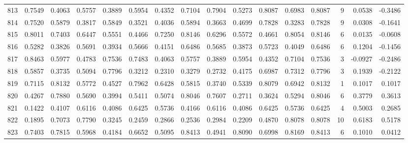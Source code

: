 \begin{tabular}{lrrrrrrrrrrrrrrr}
813 &      0.7549 &  0.4063 &  0.5757 &  0.3889 &  0.5954 &  0.4352 &  0.7104 &  0.7904 &  0.5273 &  0.8087 &   0.6983 &     0.8087 &      9 &                    0.0538 &                    -0.3486 \\
814 &      0.7520 &  0.5879 &  0.3817 &  0.5849 &  0.3521 &  0.4036 &  0.5894 &  0.3663 &  0.4699 &  0.7828 &   0.3283 &     0.7828 &      9 &                    0.0308 &                    -0.1641 \\
815 &      0.8011 &  0.7403 &  0.6447 &  0.5551 &  0.4466 &  0.7250 &  0.8146 &  0.6296 &  0.5572 &  0.4661 &   0.8054 &     0.8146 &      6 &                    0.0135 &                    -0.0608 \\
816 &      0.5282 &  0.3826 &  0.5691 &  0.3934 &  0.5666 &  0.4151 &  0.6486 &  0.5685 &  0.3873 &  0.5723 &   0.4049 &     0.6486 &      6 &                    0.1204 &                    -0.1456 \\
817 &      0.8463 &  0.5977 &  0.4783 &  0.7536 &  0.7483 &  0.4063 &  0.5757 &  0.3889 &  0.5954 &  0.4352 &   0.7104 &     0.7536 &      3 &                   -0.0927 &                    -0.2486 \\
818 &      0.5857 &  0.3735 &  0.5094 &  0.7796 &  0.3212 &  0.2310 &  0.3279 &  0.2732 &  0.4175 &  0.6987 &   0.7312 &     0.7796 &      3 &                    0.1939 &                    -0.2122 \\
819 &      0.7115 &  0.8132 &  0.5772 &  0.4527 &  0.7962 &  0.6428 &  0.5815 &  0.3740 &  0.5339 &  0.8079 &   0.6942 &     0.8132 &      1 &                    0.1017 &                     0.1017 \\
820 &      0.4267 &  0.7880 &  0.5690 &  0.3994 &  0.5411 &  0.5074 &  0.8046 &  0.7607 &  0.2711 &  0.3624 &   0.5294 &     0.8046 &      6 &                    0.3779 &                     0.3613 \\
821 &      0.1422 &  0.4107 &  0.6116 &  0.4086 &  0.6425 &  0.5736 &  0.4166 &  0.6116 &  0.4086 &  0.6425 &   0.5736 &     0.6425 &      4 &                    0.5003 &                     0.2685 \\
822 &      0.1895 &  0.7073 &  0.7790 &  0.3245 &  0.2459 &  0.2866 &  0.2536 &  0.2984 &  0.2209 &  0.4870 &   0.8078 &     0.8078 &     10 &                    0.6183 &                     0.5178 \\
823 &      0.7403 &  0.7815 &  0.5968 &  0.4184 &  0.6652 &  0.5095 &  0.8413 &  0.4941 &  0.8090 &  0.6998 &   0.8169 &     0.8413 &      6 &                    0.1010 &                     0.0412 \\

\end{tabular}
